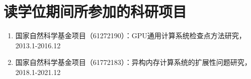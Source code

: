 \chapter{读学位期间所参加的科研项目}

\begin{enumerate}
\item 国家自然科学基金项目（61272190）：GPU通用计算系统检查点方法研究，2013.1-2016.12 
\item 国家自然科学基金项目（61772183）：异构内存计算系统的扩展性问题研究，2018.1-2021.12 
\end{enumerate}